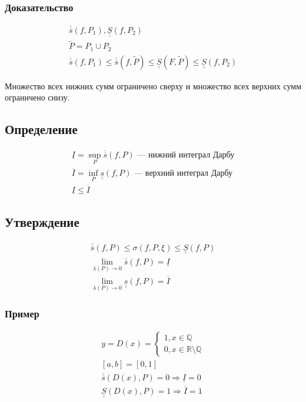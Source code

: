 \documentclass{article}
\begin{document}
\subsubsection{Доказательство}
\begin{gather*}
    \overline{\overline{s}} \left(f, P_1\right), \underline{\underline{S}} \left(f, P_2\right) \\
    \widetilde{P} = P_1 \cup P_2 \\
    \overline{\overline{s}} \left(f, P_1\right) \le 
    \overline{\overline{s}} \left(f, \widetilde{P}\right) \le
    \underline{\underline{S}} \left(F, \widetilde{P}\right) \le 
    \underline{\underline{S}} \left(f, P_2\right)
\end{gather*}

Множество всех нижних сумм ограничено сверху и множество всех верхних сумм ограничено снизу.


\subsection{Определение}
\begin{gather*}
    \underline{I} = \sup_{P} \overline{\overline{s}} \left(f, P\right) \text{ --- нижний интеграл Дарбу} \\
    \overline{I} = \inf_{P} \underline{\underline{s}} \left(f, P\right) \text{ --- верхний интеграл Дарбу} \\
    \underline{I} \le \overline{I}
\end{gather*}


\subsection{Утверждение}
\begin{gather*}
    \overline{\overline{s}} \left(f, P\right) \le \sigma \left(f, P, \xi\right) \le \underline{\underline{S}} \left(f, P\right) \\
    \lim_{\lambda(P) \to 0} \overline{\overline{s}} \left(f, P\right) = \underline{I} \\
    \lim_{\lambda(P) \to 0} \underline{\underline{s}} \left(f, P\right) = \overline{I}
\end{gather*}

\subsubsection{Пример}
\begin{gather*}
    y = D(x) = \begin{cases}
        1, x \in \mathbb{Q} \\
        0, x \in \mathbb{R} \setminus \mathbb{Q}
    \end{cases} \\
    [a, b] = [0, 1] \\
    \overline{\overline{s}} \left(D(x), P\right) = 0 \Rightarrow \underline{I} = 0 \\
    \underline{\underline{S}} \left(D(x), P\right) = 1 \Rightarrow \overline{I} = 1
\end{gather*}
\end{document}
